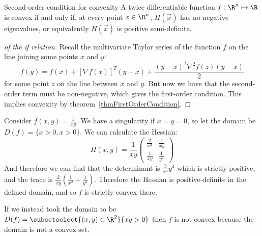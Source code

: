 \documentclass[../Main.tex]{subfiles}
\begin{document}
\begin{theorem}{Second-order condition for convexity}
    A twice differentiable function $f : \R^n \mapsto \R$ is convex if and only if, at every point $x \in \R^n$, $H(\vec{x})$ has no negative eigenvalues, or equivalently $H(\vec{x})$ is positive semi-definite.
    \label{thmSecondOrderCondition}
\end{theorem}
\begin{proof}[of the if relation]
    Recall the multivariate Taylor series of the function $f$ on the line joining some points $x$ and $y$:
    \begin{equation*}
        f(y) = f(x) + [\nabla f(x)]^T (y - x) + \frac{(y - x)^T \nabla^2 f(z) (y-x)}{2}
    \end{equation*}
    for some point $z$ on the line between $x$ and $y$. But now we have that the second-order term must be non-negative, which gives the first-order condition. This implies convexity by theorem~\ref{thmFirstOrderCondition}.
\end{proof}
\begin{example}
    Consider $f(x, y) = \frac{1}{xy}$. We have a singularity if $x = y = 0$, so let the domain be $D(f) = \{x > 0, x > 0\}$.
    We can calculate the Hessian:
    \begin{equation*}
        H(x, y) = \frac{1}{xy}
        \begin{pmatrix}
        \frac{2}{x^2} & \frac{1}{xy} \\
        \frac{1}{xy} & \frac{1}{y^2}
        \end{pmatrix}
    \end{equation*}
    And therefore we can find that the determinant is $\frac{3}{x^4}{y^4}$ which is strictly positive, and the trace is $\frac{2}{xy} \left(\frac{1}{x^2} + \frac{1}{y^2}\right)$. Therefore the Hessian is positive-definite in the defined domain, and so $f$ is strictly convex there.

    If we instead took the domain to be $D(f) = \subsetselect{(x, y) \in \R^2}{xy > 0}$ then $f$ is not convex because the domain is not a convex set.
\end{example}
\end{document}
